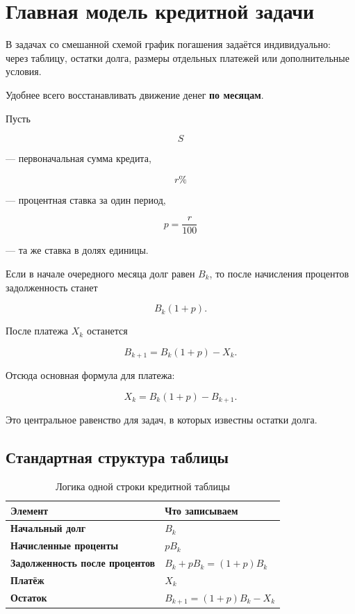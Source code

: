 \documentclass[a4paper,12pt]{article}
\newcommand{\important}[1]{\textbf{\color{darkaccent}#1}}
\begin{document}

\section{Главная модель кредитной задачи}

В задачах со смешанной схемой график погашения задаётся индивидуально:
через таблицу, остатки долга, размеры отдельных платежей или дополнительные
условия.

Удобнее всего восстанавливать движение денег \important{по месяцам}.

Пусть

\[
S
\]

--- первоначальная сумма кредита,

\[
r\%
\]

--- процентная ставка за один период,

\[
p=\frac{r}{100}
\]

--- та же ставка в долях единицы.

Если в начале очередного месяца долг равен \(B_k\), то после начисления
процентов задолженность станет

\[
B_k(1+p).
\]

После платежа \(X_k\) останется

\[
B_{k+1}=B_k(1+p)-X_k.
\]

Отсюда основная формула для платежа:

\[
\boxed{X_k=B_k(1+p)-B_{k+1}}.
\]

Это центральное равенство для задач, в которых известны остатки долга.

\subsection{Стандартная структура таблицы}

\begin{table}[h]
\centering
\caption{Логика одной строки кредитной таблицы}
\renewcommand{\arraystretch}{1.35}
\begin{tabularx}{\linewidth}{>{\bfseries}l X}
\toprule
Элемент & Что записываем \\
\midrule
Начальный долг & \(B_k\) \\
Начисленные проценты & \(pB_k\) \\
Задолженность после процентов & \(B_k+pB_k=(1+p)B_k\) \\
Платёж & \(X_k\) \\
Остаток & \(B_{k+1}=(1+p)B_k-X_k\) \\
\bottomrule
\end{tabularx}
\end{table}
\end{document}
